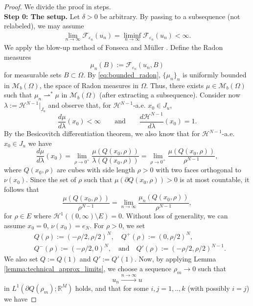 \documentclass[a4paper, 11pt, reqno]{amsart}
\theoremstyle{plain}
\theoremstyle{definition}
\theoremstyle{remark}
\newcommand{\R}{\mathbb R}
\newcommand{\eps}{\varepsilon}
\renewcommand{\H}{\mathcal H}
\begin{document}
\begin{proof}
We divide the proof in steps.\\[0.5em]
    \textbf{Step 0: The setup.}
    Let $\delta > 0$ be arbitrary. By passing to a subsequence (not relabeled), we may assume 
    \begin{align}\label{eq:bounded_radon}
        \lim_{n\to \infty} \mathcal{F}_{\eps_n}(u_n) = \liminf_{n \to \infty} \mathcal{F}_{\eps_n}(u_n) < \infty.
    \end{align}
    We apply the blow-up method of Fonseca and M\"uller \cite{fonsecamueller1999}. Define the Radon measures 
    \[
        \mu_n(B) := \mathcal{F}_{\eps_n}(u_n, B)
    \]
    for measurable sets $B \subset \Omega$.
    By \eqref{eq:bounded_radon}, $\{\mu_n\}_n$ is uniformly bounded in $\mathcal{M}_b(\Omega)$, the space of Radon measures in $\Omega$. Thus, there exists $\mu \in \mathcal{M}_b(\Omega)$ such that $\mu_n \rightharpoonup^* \mu$ in $\mathcal{M}_b(\Omega)$ (after extracting a subsequence). Consider now $\lambda := \H^{N-1}|_{J_u}$ and observe that, for $\H^{N-1}$-a.e. $x_0 \in J_u$,
    \[
        \frac{d\mu}{d\lambda}(x_0) < \infty \qquad \text{and} \qquad \frac{d\H^{N-1}}{d\lambda}(x_0) = 1.
    \]
    By the Besicovitch differentiation theorem, we also know that for $\H^{N-1}$-a.e. $x_0 \in J_u$ we have 
    \[
        \frac{d\mu}{d\lambda}(x_0) = \lim_{\rho \to 0^+} \frac{\mu(Q(x_0, \rho))}{\lambda(Q(x_0, \rho))} = \lim_{\rho \to 0^+} \frac{\mu(Q(x_0, \rho))}{\rho^{N-1}},
    \]
    where $Q(x_0, \rho)$ are cubes with side length $\rho > 0$ with two faces orthogonal to $\nu(x_0)$. Since the set of $\rho$ such that $\mu(\partial Q(x_0, \rho)) > 0$ is at most countable, it follows that
    \[
        \frac{\mu(Q(x_0, \rho))}{\rho^{N-1}} = \lim_{n \to \infty} \frac{\mu_n(Q(x_0, \rho))}{\rho^{N-1}},
    \]
    for $\rho \in E$ where $\H^{1}((0,\infty)\setminus E) = 0$. Without loss of generality, we can assume $x_0 = 0$, $\nu(x_0) = e_N$. For $\rho > 0$, we set
    \begin{align*}
        &Q(\rho) := (-\rho/2, \rho/2)^N, \quad Q^+(\rho):= (0, \rho/2)^N,   \\
        &Q^-(\rho) := (-\rho/2, 0)^N, \quad \text{and} \quad Q'(\rho) := (-\rho/2, \rho/2)^{N-1}.
    \end{align*}
    We also set $Q := Q(1)$ and $Q' := Q'(1)$. Now, by applying Lemma \ref{lemma:technical_approx_limits}, we choose a sequence $\rho_m \to 0$ such that 
    \[
        u_n \xrightarrow{n \to \infty} u
    \]
    in $L^1(\partial Q(\rho_m); \R^M)$ holds, and that for some $i,j = 1,.., k$ (with possibly $i = j$) we have

\end{proof}
\end{document}
